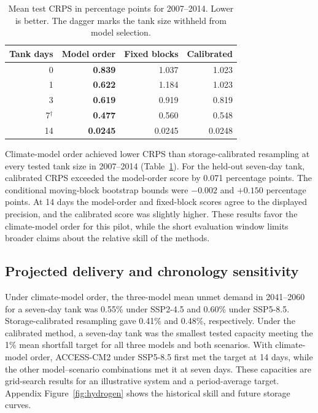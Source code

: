\begin{table}[t]
\centering\small
\caption{Mean test CRPS in percentage points for 2007--2014. Lower is better. The dagger marks the tank size withheld from model selection.}
\label{tab:test}
\begin{tabular}{@{}rrrr@{}}
\toprule
Tank days & Model order & Fixed blocks & Calibrated \\
\midrule
0 & \textbf{0.839} & 1.037 & 1.023 \\
1 & \textbf{0.622} & 1.184 & 1.023 \\
3 & \textbf{0.619} & 0.919 & 0.819 \\
7$^{\dagger}$ & \textbf{0.477} & 0.560 & 0.548 \\
14 & \textbf{0.0245} & 0.0245 & 0.0248 \\
\bottomrule
\end{tabular}
\end{table}

Climate-model order achieved lower CRPS than storage-calibrated resampling at every tested tank size in 2007--2014 (Table~\ref{tab:test}). For the held-out seven-day tank, calibrated CRPS exceeded the model-order score by 0.071 percentage points. The conditional moving-block bootstrap bounds were $-0.002$ and $+0.150$ percentage points. At 14 days the model-order and fixed-block scores agree to the displayed precision, and the calibrated score was slightly higher. These results favor the climate-model order for this pilot, while the short evaluation window limits broader claims about the relative skill of the methods.

\subsection{Projected delivery and chronology sensitivity}
Under climate-model order, the three-model mean unmet demand in 2041--2060 for a seven-day tank was 0.55\% under SSP2-4.5 and 0.60\% under SSP5-8.5. Storage-calibrated resampling gave 0.41\% and 0.48\%, respectively. Under the calibrated method, a seven-day tank was the smallest tested capacity meeting the 1\% mean shortfall target for all three models and both scenarios. With climate-model order, ACCESS-CM2 under SSP5-8.5 first met the target at 14 days, while the other model--scenario combinations met it at seven days. These capacities are grid-search results for an illustrative system and a period-average target. Appendix Figure~\ref{fig:hydrogen} shows the historical skill and future storage curves.

